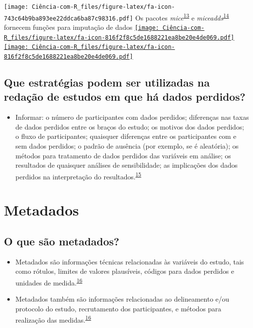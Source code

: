 \documentclass[
]{book}
\providecommand{\tightlist}{%
  \setlength{\itemsep}{0pt}\setlength{\parskip}{0pt}}
\begin{document}
\texttt{[image: Ciência-com-R\_files/figure-latex/fa-icon-743c64b9ba893ee22ddca6ba87c98316.pdf]} Os pacotes \emph{mice}\textsuperscript{\protect\hyperlink{ref-mice}{13}} e \emph{miceadds}\textsuperscript{\protect\hyperlink{ref-miceadds}{14}} fornecem funções para imputação de dados \href{https://cran.r-project.org/web/packages/mice/index.html}{\texttt{[image: Ciência-com-R\_files/figure-latex/fa-icon-816f2f8c5de1688221ea8be20e4de069.pdf]}} \href{https://cran.r-project.org/web/packages/miceadds/index.html}{\texttt{[image: Ciência-com-R\_files/figure-latex/fa-icon-816f2f8c5de1688221ea8be20e4de069.pdf]}}

\hypertarget{que-estratuxe9gias-podem-ser-utilizadas-na-redauxe7uxe3o-de-estudos-em-que-huxe1-dados-perdidos}{%
\subsection{Que estratégias podem ser utilizadas na redação de estudos em que há dados perdidos?}\label{que-estratuxe9gias-podem-ser-utilizadas-na-redauxe7uxe3o-de-estudos-em-que-huxe1-dados-perdidos}}

\begin{itemize}
\tightlist
\item
  Informar: o número de participantes com dados perdidos; diferenças nas taxas de dados perdidos entre os braços do estudo; os motivos dos dados perdidos; o fluxo de participantes; quaisquer diferenças entre os participantes com e sem dados perdidos; o padrão de ausência (por exemplo, se é aleatória); os métodos para tratamento de dados perdidos das variáveis em análise; os resultados de quaisquer análises de sensibilidade; as implicações dos dados perdidos na interpretação do resultados.\textsuperscript{\protect\hyperlink{ref-Akl2015}{15}}
\end{itemize}

\hypertarget{metadados}{%
\section{Metadados}\label{metadados}}

\hypertarget{o-que-suxe3o-metadados}{%
\subsection{O que são metadados?}\label{o-que-suxe3o-metadados}}

\begin{itemize}
\item
  Metadados são informações técnicas relacionadas às variáveis do estudo, tais como rótulos, limites de valores plausíveis, códigos para dados perdidos e unidades de medida.\textsuperscript{\protect\hyperlink{ref-Baillie2022}{16}}
\item
  Metadados também são informações relacionadas ao delineamento e/ou protocolo do estudo, recrutamento dos participantes, e métodos para realização das medidas.\textsuperscript{\protect\hyperlink{ref-Baillie2022}{16}}
\end{itemize}
\end{document}
